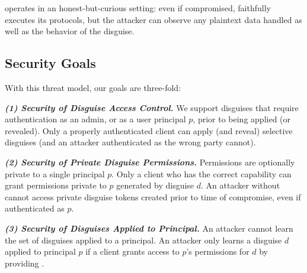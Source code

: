 %
\sys operates in an honest-but-curious setting: even if compromised, \sys faithfully executes
its protocols, but the attacker can observe any plaintext data handled as well as the behavior
of the disguise.
%

\subsection{Security Goals}

With this threat model, our goals are three-fold: 

\vspace{6pt}\noindent\textbf{\emph{(1) Security of Disguise Access Control.}}
We support disguises that require authentication as an admin, or as a user principal $p$, prior to being applied (or
revealed). Only a properly authenticated client can apply (and reveal) selective disguises
(and an attacker authenticated as the wrong party cannot).

\vspace{6pt}\noindent\textbf{\emph{(2) Security of Private Disguise Permissions.}}
Permissions are optionally private to a single principal $p$. 
Only a client who has the correct capability  can grant \sys permissions private to $p$ generated
by disguise $d$.
%
An attacker without  cannot access private disguise tokens created prior to time of compromise, even if authenticated as $p$.

\vspace{6pt}\noindent\textbf{\emph{(3) Security of Disguises Applied to Principal.}}
An attacker cannot learn the set of disguises applied to a principal. An attacker only learns a
disguise $d$ applied to principal $p$ if a client grants \sys access to $p$'s permissions for $d$ by
providing .

